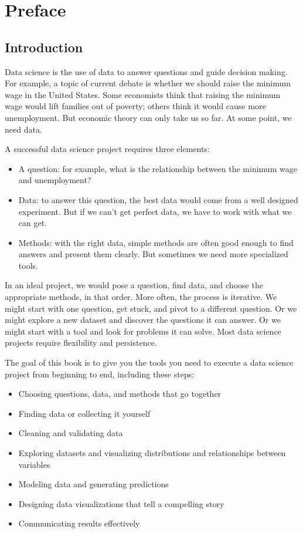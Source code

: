 \chapter{Preface}

\section*{Introduction}

Data science is the use of data to answer questions and guide decision
making. For example, a topic of current debate is whether we should
raise the minimum wage in the United States. Some economists think that
raising the minimum wage would lift families out of poverty; others
think it would cause more unemployment. But economic theory can only
take us so far. At some point, we need data.

A successful data science project requires three elements:

\begin{itemize}
\item
  A question: for example, what is the relationship between the minimum
  wage and unemployment?
\item
  Data: to answer this question, the best data would come from a
  well designed experiment. But if we can't get perfect data, we have to
  work with what we can get.
\item
  Methods: with the right data, simple methods are often good enough to find
  answers and present them clearly. But sometimes we need more
  specialized tools.
\end{itemize}

In an ideal project, we would pose a question, find data, and choose the
appropriate methods, in that order. More often, the process is
iterative. We might start with one question, get stuck, and pivot to a
different question. Or we might explore a new dataset and discover the
questions it can answer. Or we might start with a tool and look for
problems it can solve. Most data science projects require flexibility
and persistence.

The goal of this book is to give you the tools you need to execute a
data science project from beginning to end, including these steps:

\begin{itemize}
\item
  Choosing questions, data, and methods that go together
\item
  Finding data or collecting it yourself
\item
  Cleaning and validating data
\item
  Exploring datasets and visualizing distributions and relationships
  between variables
\item
  Modeling data and generating predictions
\item
  Designing data visualizations that tell a compelling story
\item
  Communicating results effectively
\end{itemize}

